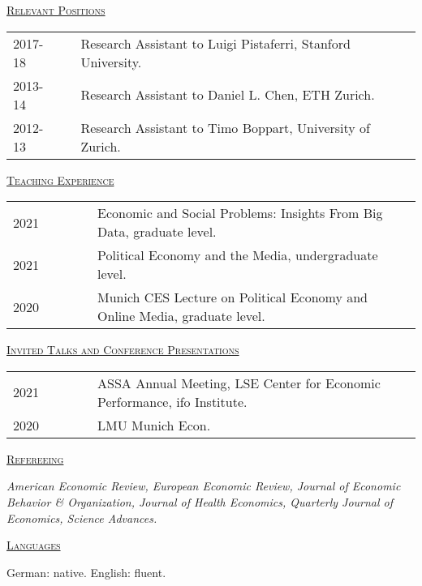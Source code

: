 \documentclass[letterpaper,11pt]{article}
\begin{document}
\underline {\textsc{Relevant Positions}}

\begin{tabular}{@{}l@{}cl@{}cl}
2017-18 & & Research Assistant to Luigi Pistaferri, Stanford University. \\
2013-14 & & Research Assistant to Daniel L. Chen, ETH Zurich. \\
2012-13 & & Research Assistant to Timo Boppart, University of Zurich.
\end{tabular}

\bigskip
 
\underline {\textsc{Teaching Experience}}

\begin{tabular}{@{}l@{}cl@{}cl}
2021 & \ \ \ \ \ & Economic and Social Problems: Insights From Big Data, graduate level. \\
2021 & \ \ \ \ \ & Political Economy and the Media, undergraduate level. \\
2020 & \ \ \ \ \ & Munich CES Lecture on Political Economy and Online Media, graduate level. \\
\end{tabular}

\bigskip
 
\underline {\textsc{Invited Talks and Conference Presentations}}

\begin{tabular}{@{}l@{}cl@{}cl}
2021 & \ \ \ \ \ & ASSA Annual Meeting, LSE Center for Economic Performance, ifo Institute. \\
2020 & \ \ \ \ \ & LMU Munich Econ. \\
\end{tabular}

\bigskip
 
\underline {\textsc{Refereeing}}

\textit{American Economic Review, European Economic Review, Journal of Economic Behavior \& Organization, Journal of Health Economics, Quarterly Journal of Economics, Science Advances.}

\bigskip
 
\underline {\textsc{Languages}}

German: native. English: fluent.
\end{document}
